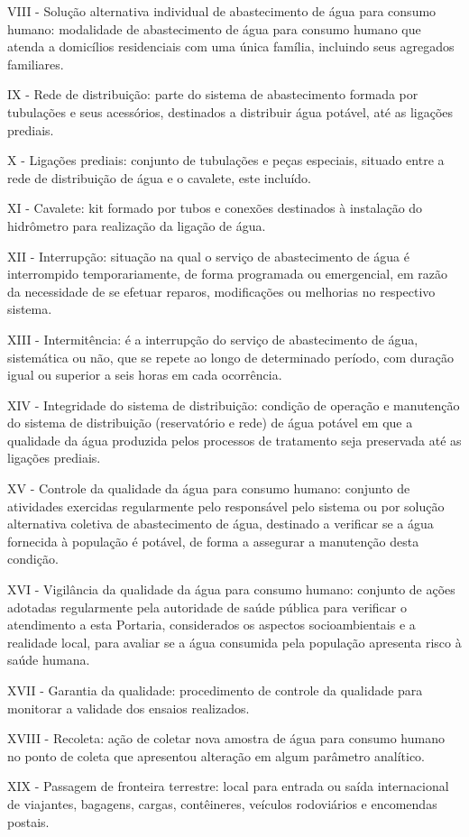 VIII - Solução alternativa individual de abastecimento de água para consumo humano: modalidade de abastecimento de água para consumo humano que atenda a domicílios residenciais com uma única família, incluindo seus agregados familiares.

IX - Rede de distribuição: parte do sistema de abastecimento formada por tubulações e seus acessórios, destinados a distribuir água potável, até as ligações prediais.

X - Ligações prediais: conjunto de tubulações e peças especiais, situado entre a rede de distribuição de água e o cavalete, este incluído.

XI - Cavalete: kit formado por tubos e conexões destinados à instalação do hidrômetro para realização da ligação de água.

XII - Interrupção: situação na qual o serviço de abastecimento de água é interrompido temporariamente, de forma programada ou emergencial, em razão da necessidade de se efetuar reparos, modificações ou melhorias no respectivo sistema.

XIII - Intermitência: é a interrupção do serviço de abastecimento de água, sistemática ou não, que se repete ao longo de determinado período, com duração igual ou superior a seis horas em cada ocorrência.

XIV - Integridade do sistema de distribuição: condição de operação e manutenção do sistema de distribuição (reservatório e rede) de água potável em que a qualidade da água produzida pelos processos de tratamento seja preservada até as ligações prediais.

XV - Controle da qualidade da água para consumo humano: conjunto de atividades exercidas regularmente pelo responsável pelo sistema ou por solução alternativa coletiva de abastecimento de água, destinado a verificar se a água fornecida à população é potável, de forma a assegurar a manutenção desta condição.

XVI - Vigilância da qualidade da água para consumo humano: conjunto de ações adotadas regularmente pela autoridade de saúde pública para verificar o atendimento a esta Portaria, considerados os aspectos socioambientais e a realidade local, para avaliar se a água consumida pela população apresenta risco à saúde humana.

XVII - Garantia da qualidade: procedimento de controle da qualidade para monitorar a validade dos ensaios realizados.

XVIII - Recoleta: ação de coletar nova amostra de água para consumo humano no ponto de coleta que apresentou alteração em algum parâmetro analítico.

XIX - Passagem de fronteira terrestre: local para entrada ou saída internacional de viajantes, bagagens, cargas, contêineres, veículos rodoviários e encomendas postais.

